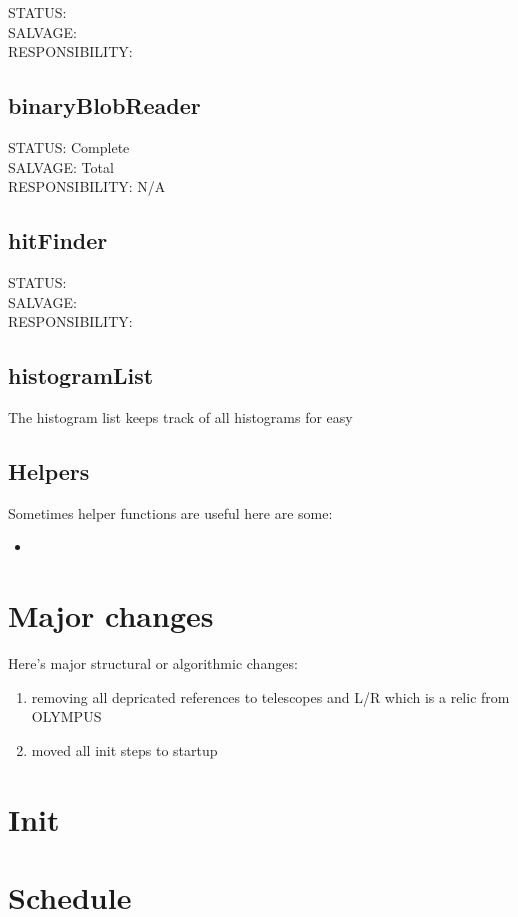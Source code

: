 \documentclass[11pt]{article}
\newcommand{\featureFooter}{
\noindent
STATUS: \\
SALVAGE:\\
RESPONSIBILITY:}
\begin{document}
	\featureFooter
	







\subsection{binaryBlobReader}


\noindent
STATUS: Complete\\
SALVAGE: Total\\
RESPONSIBILITY: N/A






\subsection{hitFinder}

\featureFooter

\subsection{histogramList}
The histogram list keeps track of all histograms for easy 

\subsection{Helpers}
Sometimes helper functions are useful here are some:

	\begin{itemize}
	\item 
	\end{itemize}

\section{Major changes}

Here's major structural or algorithmic changes:

	\begin{enumerate}
		\item 
			removing all depricated references to telescopes and L/R which is a relic from OLYMPUS
		\item 
			moved all init steps to startup
	\end{enumerate}

\section{Init}

\section{Schedule}
\end{document}
